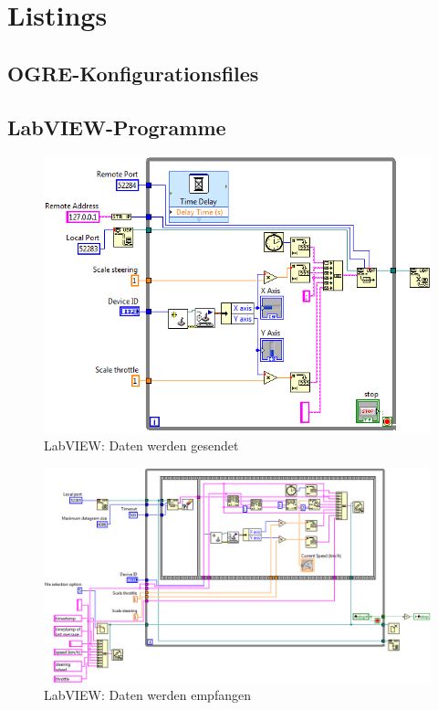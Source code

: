 \section{Listings}

\subsection{OGRE-Konfigurationsfiles}

\label{listing:plugins.cfg}


\label{listing:graphics.cfg}


\label{listing:resources.cfg}


\subsection{LabVIEW-Programme}
\label{labview_programme}

\begin{figure}[H]
\centering 
\includegraphics[width=1\linewidth]{src/labview_screenshot_drivingsimulator_daten_senden.png}
\caption{LabVIEW: Daten werden gesendet} %
\label{labview_daten_senden} %
\end{figure}

\newpage
\begin{figure}[H]
\centering 
\includegraphics[angle=90,width=0.8\linewidth]{src/labview_screenshot_drivingsimulator_daten_empfangen.png}
\caption{LabVIEW: Daten werden empfangen} %
\label{labview_daten_empfangen} %
\end{figure}
